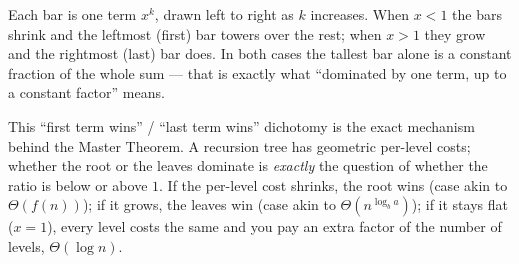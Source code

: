 \begin{center}
\end{center}

Each bar is one term $x^k$, drawn left to right as $k$ increases. When $x<1$ the
bars shrink and the leftmost (first) bar towers over the rest; when $x>1$ they
grow and the rightmost (last) bar does. In both cases the tallest bar alone is a
constant fraction of the whole sum --- that is exactly what ``dominated by one
term, up to a constant factor'' means.

\begin{intuitionbox}
This ``first term wins'' / ``last term wins'' dichotomy is the exact mechanism behind
the Master Theorem. A recursion tree has geometric per-level costs; whether the
root or the leaves dominate is \emph{exactly} the question of whether the ratio is
below or above $1$. If the per-level cost shrinks, the root wins (case akin to
$\Theta(f(n))$); if it grows, the leaves win (case akin to $\Theta(n^{\log_b a})$);
if it stays flat ($x = 1$), every level costs the same and you pay an extra factor
of the number of levels, $\Theta(\log n)$.
\end{intuitionbox}

